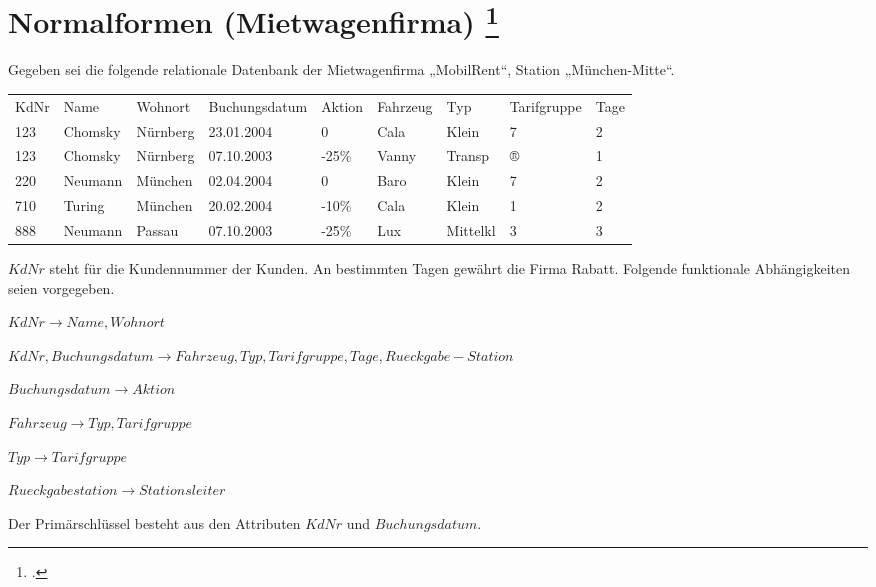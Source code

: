\documentclass{lehramt-informatik}
\begin{document}
%

\section{Normalformen (Mietwagenfirma)
\footcite[Seite 2, Aufgabe 3: Normalformen]{db:pu:4}
}

Gegeben sei die folgende relationale Datenbank der Mietwagenfirma
„MobilRent“, Station „München-Mitte“.

\renewcommand{\labelenumi}{(\alph{enumi})}

\begin{tabular}{lllllllll}
KdNr & Name & Wohnort & Buchungsdatum & Aktion & Fahrzeug & Typ & Tarifgruppe & Tage
\\

123 & Chomsky & Nürnberg & 23.01.2004 & 0 & Cala & Klein & 7 & 2
\\

123 & Chomsky & Nürnberg & 07.10.2003 & -25\% & Vanny & Transp & ® & 1
\\

220 & Neumann & München & 02.04.2004 & 0 & Baro & Klein & 7 & 2
\\

710 & Turing & München & 20.02.2004 & -10\% & Cala & Klein & 1 & 2
\\

888 & Neumann & Passau & 07.10.2003 & -25\% & Lux & Mittelkl & 3 & 3
\\
\end{tabular}

$KdNr$ steht für die Kundennummer der Kunden. An bestimmten Tagen
gewährt die Firma Rabatt. Folgende funktionale Abhängigkeiten seien
vorgegeben.

$KdNr \rightarrow Name, Wohnort$

$KdNr, Buchungsdatum \rightarrow Fahrzeug, Typ, Tarifgruppe, Tage, Rueckgabe-Station$

$Buchungsdatum \rightarrow Aktion$

$Fahrzeug \rightarrow Typ, Tarifgruppe$

$Typ \rightarrow Tarifgruppe$

$Rueckgabestation \rightarrow Stationsleiter$

Der Primärschlüssel besteht aus den Attributen $KdNr$ und
$Buchungsdatum$.
\end{document}
